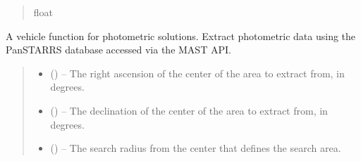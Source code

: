 \documentclass[letterpaper,11pt,english]{sphinxmanual}
\begin{document}
\begin{savenotes}
\begin{fulllineitems}
\begin{savenotes}
\begin{fulllineitems}
\begin{quote}
\begin{description}
\sphinxAtStartPar
float

\end{description}\end{quote}

\end{fulllineitems}\end{savenotes}


\end{fulllineitems}\end{savenotes}


\begin{savenotes}\begin{fulllineitems}
\label{\detokenize{code/opihiexarata.photometry.solution:opihiexarata.photometry.solution._vehicle_panstarrs_mast_web_api}}
\pysigstartsignatures
{}
\pysigstopsignatures
\sphinxAtStartPar
A vehicle function for photometric solutions. Extract photometric
data using the PanSTARRS database accessed via the MAST API.
\begin{quote}\begin{description}
\begin{itemize}
\item {} 
\sphinxAtStartPar
{} () – The right ascension of the center of the area to extract from,
in degrees.

\item {} 
\sphinxAtStartPar
{} () – The declination of the center of the area to extract from,
in degrees.

\item {} 
\sphinxAtStartPar
{} () – The search radius from the center that defines the search area.


\end{itemize}
\end{description}
\end{quote}
\end{fulllineitems}
\end{savenotes}
\end{document}
